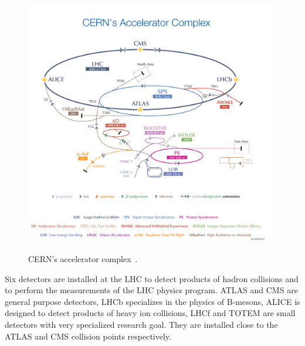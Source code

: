 \begin{figure}[htb]
  \begin{center}
    {\includegraphics[width=0.98\textwidth]{../figs/Exp/CERN_accelerator_complex2013.jpg}}
    \caption{CERN's accelerator complex~\cite{ref_fig_CERNacceleratorComplex}.}
    \label{fig:CERN_accelerator_complex}
  \end{center}
\end{figure}




Six detectors are installed at the LHC to detect products of hadron collisions and to perform the measurements of the LHC physics program. ATLAS and CMS are general purpose detectors, LHCb specializes in the physics of B-mesons, ALICE is designed to detect products of heavy ion collisions, LHCf and TOTEM are small detectors with very specialized research goal. They are installed close to the ATLAS and CMS collision points respectively. 

